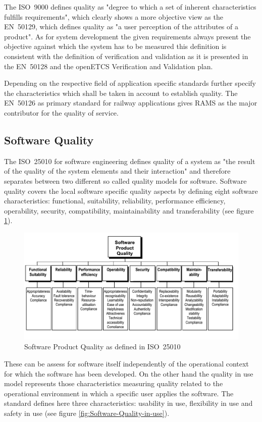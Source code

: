 \documentclass{template/openetcs_report}
\begin{document}
The ISO~9000 defines quality as "degree to which a set of inherent characteristics fulfills requirements", which clearly shows a more objective view as the EN~50129, which defines quality as "a user perception of the attributes of a product". As for system development the given requirements always present the objective against which the system has to be measured this definition is consistent with the definition of verification and validation as it is presented in the EN~50128 and the openETCS Verification and Validation plan.

Depending on the respective field of application specific standards further specify the characteristics which shall be taken in account to establish quality. The EN~50126 as primary standard for railway applications gives RAMS as the major contributor for the quality of service. 

\subsection{Software Quality}

The ISO~25010 for software engineering defines quality of a system as "the result of the quality of the system elements and their interaction" and therefore separates between two different so called quality models for software. Software quality covers the local software specific quality aspects by defining eight software characteristics: functional, suitability, reliability, performance efficiency, operability, security, compatibility, maintainability and transferability (see figure \ref{fig:Software-Product-Quality-eng}).

\begin{figure}[htbp]
\centering
\includegraphics[width=0.8\linewidth]{Software-Product-Quality-eng}
\caption{Software Product Quality as defined in ISO~25010}
\label{fig:Software-Product-Quality-eng}
\end{figure}


These can be assess for software itself independently of the operational  context for which the software has been developed. On the other hand the quality in use model represents those characteristics measuring quality related to the operational environment in which a specific user applies the software. The standard defines here three characteristics: 
usability in use, flexibility in use and safety in use (see figure \ref{fig:Software-Quality-in-use}).
\end{document}
